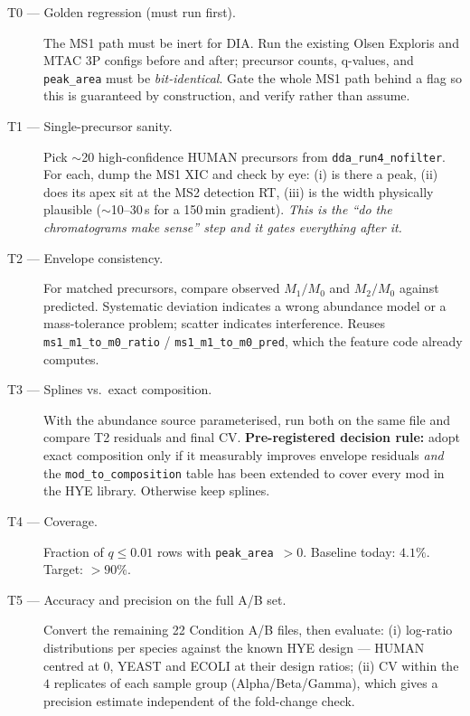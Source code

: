 \documentclass[11pt]{article}
\newcommand{\code}[1]{\texttt{\small #1}}
\begin{document}
\begin{description}
  \item[T0 --- Golden regression (must run first).] The MS1 path must be inert for DIA. Run the
        existing Olsen Exploris and MTAC 3P configs before and after; precursor counts,
        q-values, and \code{peak\_area} must be \emph{bit-identical}. Gate the whole MS1 path
        behind a flag so this is guaranteed by construction, and verify rather than assume.

  \item[T1 --- Single-precursor sanity.] Pick $\sim$20 high-confidence HUMAN precursors from
        \code{dda\_run4\_nofilter}. For each, dump the MS1 XIC and check by eye:
        (i) is there a peak, (ii) does its apex sit at the MS2 detection RT, (iii) is the width
        physically plausible ($\sim$10--30\,s for a 150\,min gradient). \emph{This is the
        ``do the chromatograms make sense'' step and it gates everything after it.}

  \item[T2 --- Envelope consistency.] For matched precursors, compare observed
        $M_1/M_0$ and $M_2/M_0$ against predicted. Systematic deviation indicates a wrong
        abundance model or a mass-tolerance problem; scatter indicates interference.
        Reuses \code{ms1\_m1\_to\_m0\_ratio} / \code{ms1\_m1\_to\_m0\_pred}, which the feature
        code already computes.

  \item[T3 --- Splines vs.\ exact composition.] With the abundance source parameterised, run both
        on the same file and compare T2 residuals and final CV. \textbf{Pre-registered decision
        rule:} adopt exact composition only if it measurably improves envelope residuals
        \emph{and} the \code{mod\_to\_composition} table has been extended to cover every mod in
        the HYE library. Otherwise keep splines.

  \item[T4 --- Coverage.] Fraction of $q\le0.01$ rows with \code{peak\_area}~$>0$.
        Baseline today: $4.1\%$. Target: $>90\%$.

  \item[T5 --- Accuracy and precision on the full A/B set.] Convert the remaining 22
        Condition A/B files, then evaluate: (i) log-ratio distributions per species against the
        known HYE design --- HUMAN centred at $0$, YEAST and ECOLI at their design ratios;
        (ii) CV within the $4$ replicates of each sample group (Alpha/Beta/Gamma), which gives
        a precision estimate independent of the fold-change check.


\end{description}
\end{document}
